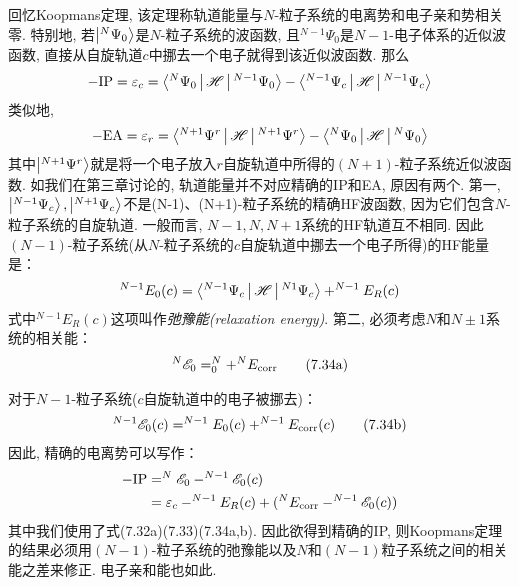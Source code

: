 回忆Koopmans定理, 该定理称轨道能量与$N$-粒子系统的电离势和电子亲和势相关零. 特别地, 若$\Ket{^N\Psi_0}$是$N$-粒子系统的\hft 波函数, 且$^{N-1}\Psi_0$是$N-1$-电子体系的近似波函数, 直接从自旋轨道$c$中挪去一个电子就得到该近似波函数. 那么
\begin{align}
-\mathrm{IP} = \varepsilon_c = \Braket{^N\Psi_0|\mathscr{H}| ^{N-1}\Psi_0} - \Braket{^{N-1}\Psi_c|\mathscr{H}|^{N-1}\Psi_c}
\end{align}
类似地,
\begin{align}
-\mathrm{EA} = \varepsilon_r = \Braket{^{N+1}\Psi^r|\mathscr{H}| ^{N+1}\Psi^r} - \Braket{^{N}\Psi_0|\mathscr{H}|^{N}\Psi_0}
\end{align}
其中$\Ket{^{N+1}\Psi^r}$就是将一个电子放入$r$自旋轨道中所得的$(N+1)$-粒子系统近似波函数. 如我们在第三章讨论的, 轨道能量并不对应精确的IP和EA, 原因有两个. 第一,$\Ket{^{N-1}\Psi_c},\Ket{^{N+1}\Psi_c}$不是(N-1)、(N+1)-粒子系统的精确HF波函数, 因为它们包含$N$-粒子系统的自旋轨道. 一般而言, $N-1,N,N+1$系统的HF轨道互不相同. 因此$(N-1)$-粒子系统(从$N$-粒子系统的$c$自旋轨道中挪去一个电子所得)的HF能量是：
\begin{align}
^{N-1}E_0(c) = \Braket{^{N-1}\Psi_c|\mathscr{H}|^{N1}\Psi_c} + ^{N-1}E_R(c)
\end{align}
式中$^{N-1}E_R(c)$这项叫作\emph{弛豫能(relaxation energy)}. 第二, 必须考虑$N$和$N\pm1$系统的相关能：
\begin{align}
^N\mathscr{E}_0 = ^N_0 + ^NE_\mathrm{corr}\tag{7.34a}
\end{align}
\addtocounter{equation}{-1}
对于$N-1$-粒子系统($c$自旋轨道中的电子被挪去)：
\begin{align}
^{N-1}\mathscr{E}_0(c) = ^{N-1}E_0(c) + ^{N-1}E_\mathrm{corr}(c)\tag{7.34b}
\end{align}
因此, 精确的电离势可以写作：
\begin{align}
-\mathrm{IP} & = ^N\mathscr{E}_0 - ^{N-1}\mathscr{E}_0(c)\notag\\
             & = \varepsilon_c - ^{N-1}E_R(c) + (^NE_\mathrm{corr} - ^{N-1}\mathscr{E}_0(c))
\end{align}
其中我们使用了式(7.32a)(7.33)(7.34a,b). 因此欲得到精确的IP, 则Koopmans定理的结果必须用$(N-1)$-粒子系统的弛豫能以及$N$和$(N-1)$粒子系统之间的相关能之差来修正. 电子亲和能也如此. 
